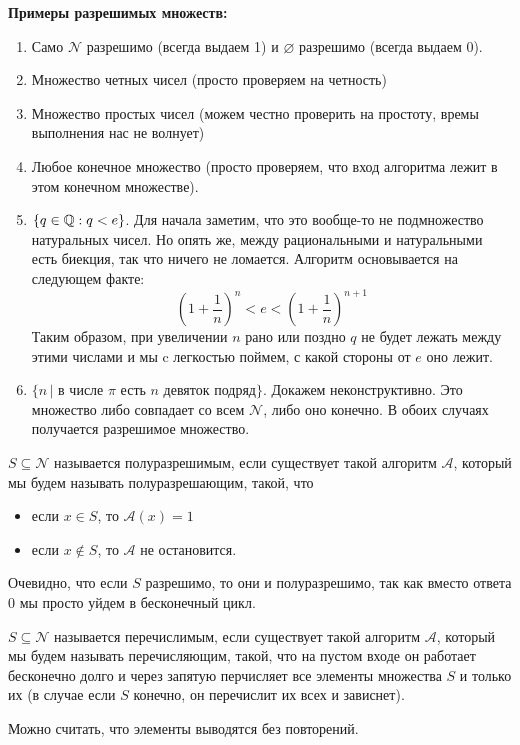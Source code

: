\textbf{Примеры разрешимых множеств:} \begin{enumerate}
    \item Само $\mathcal{N}$ разрешимо (всегда выдаем 1) и $\varnothing$ разрешимо (всегда выдаем 0).
    \item Множество четных чисел (просто проверяем на четность)
    \item Множество простых чисел (можем честно проверить на простоту, времы выполнения нас не волнует)
    \item Любое конечное множество (просто проверяем, что вход алгоритма лежит в этом конечном множестве).
    \item $\{ q \in \mathbb{Q} : q < e \}$. Для начала заметим, что это вообще-то не подмножество натуральных чисел. Но опять же, между рациональными и натуральными есть биекция, так что ничего не ломается. Алгоритм основывается на следующем факте: \[ \left(1 + \frac{1}{n} \right)^n < e < \left(1 + \frac{1}{n} \right)^{n+1} \]
    Таким образом, при увеличении $n$ рано или поздно $q$ не будет лежать между этими числами и мы c легкостью поймем, с какой стороны от $e$ оно лежит.
    \item $\{ n \, | \text{ в числе $\pi$ есть $n$ девяток подряд} \}$. Докажем неконструктивно. Это множество либо совпадает со всем $\mathcal{N}$, либо оно конечно. В обоих случаях получается разрешимое множество.
\end{enumerate}

\begin{conj}
    $S \subseteq \mathcal{N}$ называется полуразрешимым, если существует такой алгоритм $\mathcal{A}$, который мы будем называть полуразрешающим, такой, что \begin{itemize}
        \item если $x \in S$, то $\mathcal{A}(x) = 1$
        \item если $x \notin S$, то $\mathcal{A}$ не остановится.
    \end{itemize}
\end{conj}

Очевидно, что если $S$ разрешимо, то они и полуразрешимо, так как вместо ответа 0 мы просто уйдем в бесконечный цикл.

\begin{conj}
    $S \subseteq \mathcal{N}$ называется перечислимым, если существует такой алгоритм $\mathcal{A}$, который мы будем называть перечисляющим, такой, что на пустом входе он работает бесконечно долго и через запятую перчисляет все элементы множества $S$ и только их (в случае если $S$ конечно, он перечислит их всех и зависнет). 
\end{conj}
\begin{notice}
    Можно считать, что элементы выводятся без повторений.
\end{notice}

